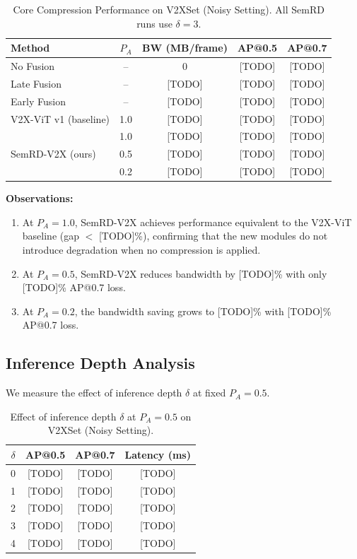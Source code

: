 \begin{table}[htbp]
\centering
\caption{Core Compression Performance on V2XSet (Noisy Setting). All SemRD
runs use $\delta = 3$.}
\label{tab:compression}
\begin{tabular}{|l|c|c|c|c|}
\hline
\textbf{Method} & \textbf{$P_A$} & \textbf{BW (MB/frame)} & \textbf{AP@0.5} & \textbf{AP@0.7} \\
\hline
No Fusion   & --  & 0      & [TODO]  & [TODO]  \\
Late Fusion & --  & [TODO] & [TODO]  & [TODO]  \\
Early Fusion & -- & [TODO] & [TODO]  & [TODO]  \\
V2X-ViT v1 (baseline) & 1.0 & [TODO] & [TODO] & [TODO] \\
\hline
\multirow{3}{*}{SemRD-V2X (ours)}
  & 1.0 & [TODO] & [TODO] & [TODO] \\
  & 0.5 & [TODO] & [TODO] & [TODO] \\
  & 0.2 & [TODO] & [TODO] & [TODO] \\
\hline
\end{tabular}
\end{table}

\textbf{Observations:}
\begin{enumerate}
    \item At $P_A = 1.0$, SemRD-V2X achieves performance equivalent to the
          V2X-ViT baseline (gap $<$ [TODO]\%), confirming that the new modules
          do not introduce degradation when no compression is applied.
    \item At $P_A = 0.5$, SemRD-V2X reduces bandwidth by [TODO]\% with only
          [TODO]\% AP@0.7 loss.
    \item At $P_A = 0.2$, the bandwidth saving grows to [TODO]\% with
          [TODO]\% AP@0.7 loss.
\end{enumerate}

\subsection{Inference Depth Analysis}
\label{sec:exp-depth}

We measure the effect of inference depth $\delta$ at fixed $P_A = 0.5$.

\begin{table}[htbp]
\centering
\caption{Effect of inference depth $\delta$ at $P_A = 0.5$ on V2XSet
(Noisy Setting).}
\label{tab:depth}
\begin{tabular}{|c|c|c|c|}
\hline
$\delta$ & \textbf{AP@0.5} & \textbf{AP@0.7} & \textbf{Latency (ms)} \\
\hline
0 & [TODO] & [TODO] & [TODO] \\
1 & [TODO] & [TODO] & [TODO] \\
2 & [TODO] & [TODO] & [TODO] \\
3 & [TODO] & [TODO] & [TODO] \\
4 & [TODO] & [TODO] & [TODO] \\
\hline
\end{tabular}
\end{table}

